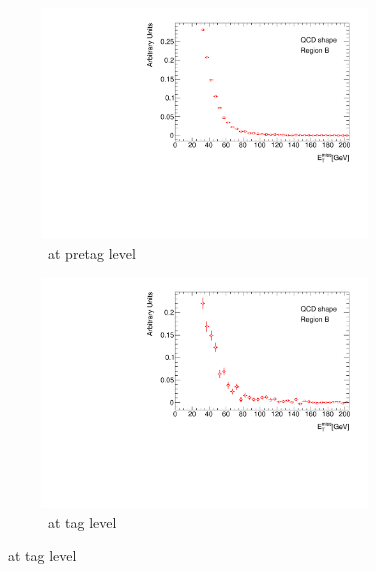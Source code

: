 \begin{figure}[htbp]
  \centering
    \begin{subfigure}[b]{0.45\textwidth}
      \includegraphics[width=0.95\textwidth]{PartCrossSection/Plots/Electron/h_el_pretag_MET_wgt.pdf}
      \caption{\met\ at pretag level}\label{fig:CrossRegionBpreMET}
    \end{subfigure}
    \;
    \begin{subfigure}[b]{0.45\textwidth}
      \includegraphics[width=0.95\textwidth]{PartCrossSection/Plots/Electron/h_el_tag_MET_wgt.pdf}
      \caption{\met\ at tag level}\label{fig:CrossRegionBTagMET}
    \end{subfigure}


\end{figure}
